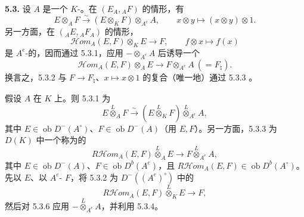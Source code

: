 \textbf{5.3.} 设 $A$ 是一个 $K$-。在 $(E_A,{}_AF)$ 的情形，有
\begin{equation}E\otimes_A F\xrightarrow\sim(E\otimes_K F)\otimes_{A^e}A,\qquad x\otimes y\longmapsto(x\otimes y)\otimes1.\tag{5.3.1}\end{equation}
另一方面，在 $({}_AE,{}_AF_A)$ 的情形，
\begin{equation}\mathcal{H}\!om_A(E,F)\otimes_K E\longrightarrow F,\qquad f\otimes x\longmapsto f(x)\tag{5.3.2}\end{equation}
是 $A^e$-的，因而通过 5.3.1，应用 $-\otimes_{A^e}A$ 后诱导一个
\begin{equation}\mathcal{H}\!om_A(E,F)\otimes_A E\longrightarrow F\otimes_{A^e}A\ (=F_\natural).\tag{5.3.3}\end{equation}
换言之，5.3.2 与 $F\to F_\natural$、$x\mapsto x\otimes1$ 的复合（唯一地）通过 5.3.3 。

假设 $A$ 在 $K$ 上。则 5.3.1 为
\begin{equation}E\overset L\otimes_A F\xrightarrow\sim(E\overset L\otimes_K F)\overset L\otimes_{A^e}A,\tag{5.3.4}\end{equation}
其中 $E\in\operatorname{ob}D^-(A^\circ)$、$F\in\operatorname{ob}D^-(A)$（用 $E,F$）。另一方面，5.3.3 为 $D(K)$ 中一个称为的
\begin{equation}R\mathcal{H}\!om_A(E,F)\overset L\otimes_A E\longrightarrow F\overset L\otimes_{A^e}A,\tag{5.3.5}\end{equation}
其中 $E\in\operatorname{ob}D^-(A)$、$F\in\operatorname{ob}D^b(A^e)$，且 $R\mathcal{H}\!om_A(E,F)\in\operatorname{ob}D^b(A^\circ)$。先以 $E$、以 $A^e$- $F$，将 5.3.2 为 $D^-((A^e)^\circ)$ 中的
\begin{equation}R\mathcal{H}\!om_A(E,F)\overset L\otimes_K E\longrightarrow F,\tag{5.3.6}\end{equation}
然后对 5.3.6 应用 $-\overset L\otimes_{A^e}A$，并利用 5.3.4。

